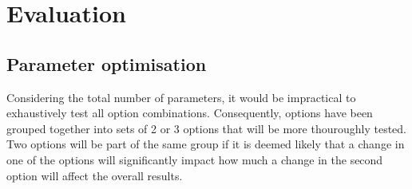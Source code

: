 \documentclass[]{ceurart}
\begin{document}
%
%
%
%
%
%

\section{Evaluation}
\label{sec:evaluation}


\subsection{Parameter optimisation}

Considering the total number of parameters, it would be impractical to exhaustively test all option combinations. Consequently, options have been grouped together into sets of 2 or 3 options that will be more thouroughly tested. Two options will be part of the same group if it is deemed likely that a change in one of the options will significantly impact how much a change in the second option will affect the overall results.
\end{document}
